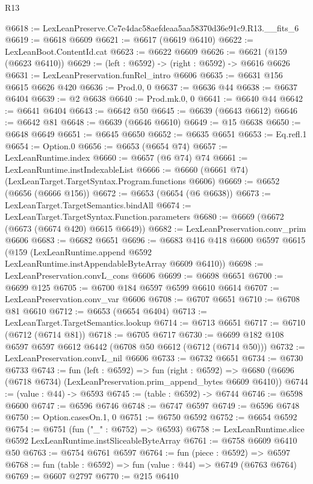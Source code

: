 \begin{lexlean}{R13}
\begin{coremodule}
@6618 := LexLeanPreserve.Ce7e4dac58aefdeaa5aa58370d36e91c9.R13.__fits_6
@6619 := @6618 @6609
@6621 := @6617 (@6619 @6410)
@6622 := LexLeanBoot.ContentId.cat
@6623 := @6622 @6609
@6626 := @6621 (@159 (@6623 @6410))
@6629 := (left : @6592) -> (right : @6592) -> @6616 @6626
@6631 := LexLeanPreservation.funRel_intro @6606
@6635 := @6631 @156 @6615 @6626 @420
@6636 := Prod.{0, 0}
@6637 := @6636 @44
@6638 := @6637 @6404
@6639 := @2 @6638
@6640 := Prod.mk.{0, 0}
@6641 := @6640 @44
@6642 := @6641 @6404
@6643 := @6642 @50
@6645 := @6639 (@6643 @6612)
@6646 := @6642 @81
@6648 := @6639 (@6646 @6610)
@6649 := @15 @6638
@6650 := @6648 @6649
@6651 := @6645 @6650
@6652 := @6635 @6651
@6653 := Eq.refl.{1}
@6654 := Option.{0}
@6656 := @6653 (@6654 @74)
@6657 := LexLeanRuntime.index
@6660 := @6657 (@6 @74) @74
@6661 := LexLeanRuntime.instIndexableList
@6666 := @6660 (@6661 @74) (LexLeanTarget.TargetSyntax.Program.functions @6606)
@6669 := @6652 (@6656 (@6666 @156))
@6672 := @6653 (@6654 (@6 @6638))
@6673 := LexLeanTarget.TargetSemantics.bindAll
@6674 := LexLeanTarget.TargetSyntax.Function.parameters
@6680 := @6669 (@6672 (@6673 (@6674 @420) @6615 @6649))
@6682 := LexLeanPreservation.conv_prim @6606
@6683 := @6682 @6651
@6696 := @6683
    @416
    @418
    @6600
    @6597
    @6615
    (@159 (LexLeanRuntime.append @6592 LexLeanRuntime.instAppendableByteArray @6609 @6410))
@6698 := LexLeanPreservation.convL_cons @6606
@6699 := @6698 @6651
@6700 := @6699 @125
@6705 := @6700 @184 @6597 @6599 @6610 @6614
@6707 := LexLeanPreservation.conv_var @6606
@6708 := @6707 @6651
@6710 := @6708 @81 @6610
@6712 := @6653 (@6654 @6404)
@6713 := LexLeanTarget.TargetSemantics.lookup
@6714 := @6713 @6651
@6717 := @6710 (@6712 (@6714 @81))
@6718 := @6705 @6717
@6730 := @6699 @182 @108 @6597 @6597 @6612 @6442 (@6708 @50 @6612 (@6712 (@6714 @50)))
@6732 := LexLeanPreservation.convL_nil @6606
@6733 := @6732 @6651
@6734 := @6730 @6733
@6743 := fun (left : @6592) =>
  fun (right : @6592) =>
  @6680 (@6696 (@6718 @6734) (LexLeanPreservation.prim_append_bytes @6609 @6410))
@6744 := (value : @44) -> @6593
@6745 := (table : @6592) -> @6744
@6746 := @6598 @6600
@6747 := @6596 @6746
@6748 := @6747 @6597
@6749 := @6596 @6748
@6750 := Option.casesOn.{1, 0}
@6751 := @6750 @6592
@6752 := @6654 @6592
@6754 := @6751 (fun ("_" : @6752) => @6593)
@6758 := LexLeanRuntime.slice @6592 LexLeanRuntime.instSliceableByteArray
@6761 := @6758 @6609 @6410 @50
@6763 := @6754 @6761 @6597
@6764 := fun (piece : @6592) => @6597
@6768 := fun (table : @6592) => fun (value : @44) => @6749 (@6763 @6764)
@6769 := @6607 @2797
@6770 := @215 @6410

\end{coremodule}
\end{lexlean}
